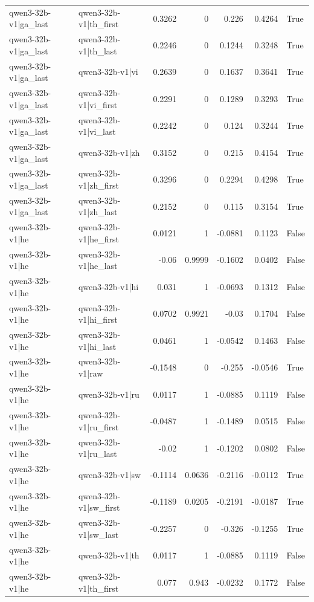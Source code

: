 \begin{table}
\begin{tabular}{l l r r r r l}
qwen3-32b-v1|ga_last & qwen3-32b-v1|th_first & 0.3262 & 0 & 0.226 & 0.4264 & True \\
qwen3-32b-v1|ga_last & qwen3-32b-v1|th_last & 0.2246 & 0 & 0.1244 & 0.3248 & True \\
qwen3-32b-v1|ga_last & qwen3-32b-v1|vi & 0.2639 & 0 & 0.1637 & 0.3641 & True \\
qwen3-32b-v1|ga_last & qwen3-32b-v1|vi_first & 0.2291 & 0 & 0.1289 & 0.3293 & True \\
qwen3-32b-v1|ga_last & qwen3-32b-v1|vi_last & 0.2242 & 0 & 0.124 & 0.3244 & True \\
qwen3-32b-v1|ga_last & qwen3-32b-v1|zh & 0.3152 & 0 & 0.215 & 0.4154 & True \\
qwen3-32b-v1|ga_last & qwen3-32b-v1|zh_first & 0.3296 & 0 & 0.2294 & 0.4298 & True \\
qwen3-32b-v1|ga_last & qwen3-32b-v1|zh_last & 0.2152 & 0 & 0.115 & 0.3154 & True \\
qwen3-32b-v1|he & qwen3-32b-v1|he_first & 0.0121 & 1 & -0.0881 & 0.1123 & False \\
qwen3-32b-v1|he & qwen3-32b-v1|he_last & -0.06 & 0.9999 & -0.1602 & 0.0402 & False \\
qwen3-32b-v1|he & qwen3-32b-v1|hi & 0.031 & 1 & -0.0693 & 0.1312 & False \\
qwen3-32b-v1|he & qwen3-32b-v1|hi_first & 0.0702 & 0.9921 & -0.03 & 0.1704 & False \\
qwen3-32b-v1|he & qwen3-32b-v1|hi_last & 0.0461 & 1 & -0.0542 & 0.1463 & False \\
qwen3-32b-v1|he & qwen3-32b-v1|raw & -0.1548 & 0 & -0.255 & -0.0546 & True \\
qwen3-32b-v1|he & qwen3-32b-v1|ru & 0.0117 & 1 & -0.0885 & 0.1119 & False \\
qwen3-32b-v1|he & qwen3-32b-v1|ru_first & -0.0487 & 1 & -0.1489 & 0.0515 & False \\
qwen3-32b-v1|he & qwen3-32b-v1|ru_last & -0.02 & 1 & -0.1202 & 0.0802 & False \\
qwen3-32b-v1|he & qwen3-32b-v1|sw & -0.1114 & 0.0636 & -0.2116 & -0.0112 & True \\
qwen3-32b-v1|he & qwen3-32b-v1|sw_first & -0.1189 & 0.0205 & -0.2191 & -0.0187 & True \\
qwen3-32b-v1|he & qwen3-32b-v1|sw_last & -0.2257 & 0 & -0.326 & -0.1255 & True \\
qwen3-32b-v1|he & qwen3-32b-v1|th & 0.0117 & 1 & -0.0885 & 0.1119 & False \\
qwen3-32b-v1|he & qwen3-32b-v1|th_first & 0.077 & 0.943 & -0.0232 & 0.1772 & False \\

\end{tabular}
\end{table}
